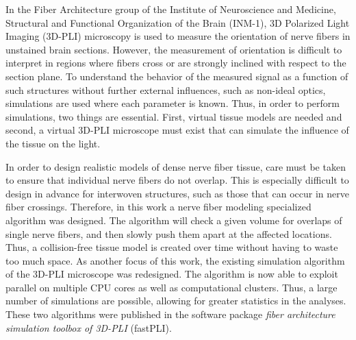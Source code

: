 %
In the Fiber Architecture group of the Institute of Neuroscience and Medicine, Structural and Functional Organization of the Brain (INM-1), 3D Polarized Light Imaging (3D-PLI) microscopy is used to measure the orientation of nerve fibers in unstained brain sections.
However, the measurement of orientation is difficult to interpret in regions where fibers cross or are strongly inclined with respect to the section plane.
To understand the behavior of the measured signal as a function of such structures without further external influences, such as non-ideal optics, simulations are used where each parameter is known.
Thus, in order to perform simulations, two things are essential.
First, virtual tissue models are needed and second, a virtual 3D-PLI microscope must exist that can simulate the influence of the tissue on the light.

In order to design realistic models of dense nerve fiber tissue, care must be taken to ensure that individual nerve fibers do not overlap.
This is especially difficult to design in advance for interwoven structures, such as those that can occur in nerve fiber crossings.
Therefore, in this work a nerve fiber modeling specialized algorithm was designed.
The algorithm will check a given volume for overlaps of single nerve fibers, and then slowly push them apart at the affected locations.
Thus, a collision-free tissue model is created over time without having to waste too much space.
As another focus of this work, the existing simulation algorithm of the 3D-PLI microscope was redesigned.
The algorithm is now able to exploit parallel on multiple CPU cores as well as computational clusters.
Thus, a large number of simulations are possible, allowing for greater statistics in the analyses.
These two algorithms were published in the software package \textit{fiber architecture simulation toolbox of 3D-PLI} (fastPLI). 

